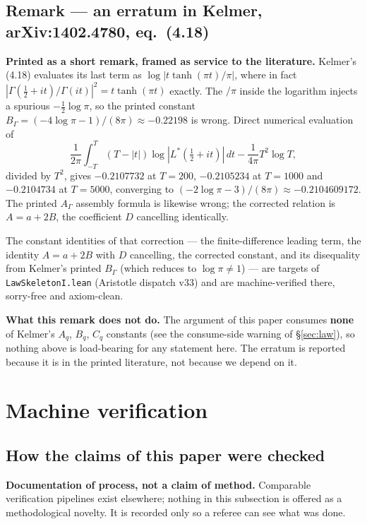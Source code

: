 \documentclass[11pt]{amsart}
\theoremstyle{remark}
\begin{document}
\subsection{Remark --- an erratum in Kelmer, arXiv:1402.4780, eq.\ (4.18)}
\label{sec:erratum}

\textbf{Printed as a short remark, framed as service to the
literature.} Kelmer's (4.18) evaluates its last term as
$\log|t\tanh(\pi t)/\pi|$, where in fact
$|\Gamma(\tfrac12+it)/\Gamma(it)|^2=t\tanh(\pi t)$ exactly. The $/\pi$
inside the logarithm injects a spurious $-\tfrac12\log\pi$, so the
printed constant $B_\Gamma=(-4\log\pi-1)/(8\pi)\approx-0.22198$ is
wrong. Direct numerical evaluation of
\[
\frac{1}{2\pi}\int_{-T}^{T}(T-|t|)\log|L^*(\tfrac12+it)|\,dt-\frac{1}{4\pi}T^2\log T,
\]
divided by $T^2$, gives $-0.2107732$ at $T=200$, $-0.2105234$ at
$T=1000$ and $-0.2104734$ at $T=5000$, converging to
$(-2\log\pi-3)/(8\pi)\approx-0.2104609172$. The printed $A_\Gamma$
assembly formula is likewise wrong; the corrected relation is
$A=a+2B$, the coefficient $D$ cancelling identically.

The constant identities of that correction --- the finite-difference
leading term, the identity $A=a+2B$ with $D$ cancelling, the corrected
constant, and its disequality from Kelmer's printed $B_\Gamma$ (which
reduces to $\log\pi\neq1$) --- are targets of
\texttt{LawSkeletonI.lean} (Aristotle dispatch v33) and are
machine-verified there, sorry-free and axiom-clean.

\textbf{What this remark does not do.} The argument of this paper
consumes \textbf{none} of Kelmer's $A_q$, $B_q$, $C_q$ constants (see the
consume-side warning of \S\ref{sec:law}), so nothing above is
load-bearing for any statement here. The erratum is reported because it
is in the printed literature, not because we depend on it.

\section{Machine verification}
\label{sec:machineverif}

\subsection{How the claims of this paper were checked}

\textbf{Documentation of process, not a claim of method.} Comparable
verification pipelines exist elsewhere; nothing in this subsection is
offered as a methodological novelty. It is recorded only so a referee
can see what was done.
\end{document}
